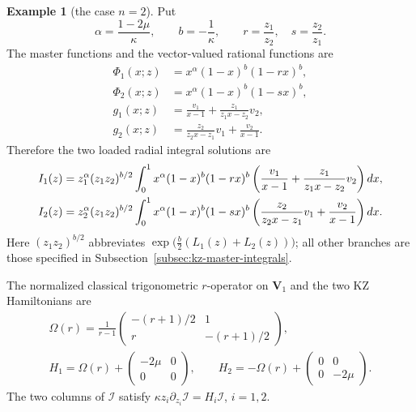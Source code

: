 \documentclass[12pt]{amsart}
\let\sssize\scriptscriptstyle \def\tfrac{\textstyle\frac}
\theoremstyle{definition}
\numberwithin{equation}{section}
\theoremstyle{definition}
\newtheorem*{example}{Example}
\let\mc\mathcal
\let\ka\kappa
\let\Om\Omega
\def\0{{\sssize0}}
\def\beq{\begin{equation}}
\def\eeq{\end{equation}}
\begin{document}
\begin{example}[the case $n=2$]
Put
\[
 \alpha=\frac{1-2\mu}{\ka},\qquad
 b=-\frac1\ka,\qquad
 r=\frac{z_1}{z_2},\quad s=\frac{z_2}{z_1}.
\]
The master functions and the vector-valued rational functions are
\begin{align*}
 \Phi_1(x;z)&=x^\alpha(1-x)^b(1-rx)^b,\\
 \Phi_2(x;z)&=x^\alpha(1-x)^b(1-sx)^b,\\
 g_1(x;z)&=\frac{v_1}{x-1}+\frac{z_1}{z_1x-z_2}v_2,\\
 g_2(x;z)&=\frac{z_2}{z_2x-z_1}v_1+\frac{v_2}{x-1}.
\end{align*}
Therefore the two loaded radial integral solutions are
\begin{align}
 I_1(z)&=z_1^\alpha(z_1z_2)^{b/2}
 \int_0^1x^\alpha(1-x)^b(1-rx)^b
 \left(\frac{v_1}{x-1}+\frac{z_1}{z_1x-z_2}v_2\right)dx,\notag\\
 I_2(z)&=z_2^\alpha(z_1z_2)^{b/2}
 \int_0^1x^\alpha(1-x)^b(1-sx)^b
 \left(\frac{z_2}{z_2x-z_1}v_1+\frac{v_2}{x-1}\right)dx.
 \label{eq:n2-kz-integrals}
\end{align}
Here $(z_1z_2)^{b/2}$ abbreviates
$\exp\bigl(\tfrac b2(L_1(z)+L_2(z))\bigr)$;
all other branches are those specified in Subsection~\ref{subsec:kz-master-integrals}.

The normalized classical trigonometric $r$-operator on
$\mathbf V_1$ and the two KZ Hamiltonians are
\beq\label{eq:n2-kz-H}
 \begin{gathered}
 \Om(r)=\frac1{r-1}
 \begin{pmatrix}-(r+1)/2&1\\r&-(r+1)/2\end{pmatrix},\\[4pt]
 H_1=\Om(r)+\begin{pmatrix}-2\mu&0\\0&0\end{pmatrix},\qquad
 H_2=-\Om(r)+\begin{pmatrix}0&0\\0&-2\mu\end{pmatrix}.
 \end{gathered}
\eeq
The two columns of $\mc I$ satisfy
$\ka z_i\partial_{z_i}\mc I=H_i\mc I$, $i=1,2$.


\end{example}
\end{document}
